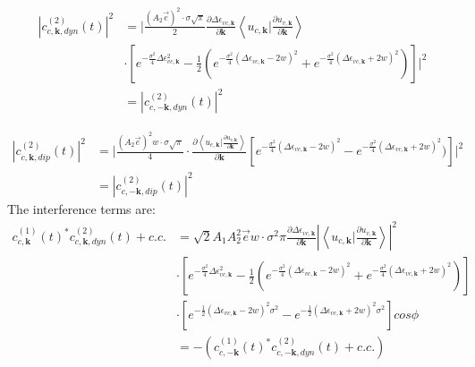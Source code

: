 \begin{equation}
\begin{aligned}
    |c^{(2)}_{c,\mathbf k,dyn}(t)|^2&= \lvert \frac{(A_2 \vec e)^2 \cdot \sigma \sqrt{\pi}}{2}
  \frac{\partial  \Delta \epsilon_{vc,\mathbf k}}{\partial \mathbf k} \left \langle u_{c,\mathbf k}\Big
  |\frac{\partial u_{v,\mathbf k}}{\partial \mathbf k} \right \rangle\\ 
                                  &    \cdot [e^{-\frac{\sigma^2}{4} \Delta \epsilon_{vc,\mathbf k} ^2}-\frac{1}{2}(e^{-\frac{\sigma^2}{4} (\Delta \epsilon_{vc,\mathbf k}-2w)^2}+e^{-\frac{\sigma^2}{4} (\Delta \epsilon_{vc,\mathbf k}+2w)^2})] \rvert^2\\
    &=|c^{(2)}_{c,-\mathbf k,dyn}(t)|^2
\end{aligned}
\end{equation}

\begin{equation}
\begin{aligned}
  |c^{(2)}_{c,\mathbf k,dip}(t)|^2&= \lvert \frac{(A_2 \vec e)^2 w \cdot \sigma \sqrt{\pi}}{4} \cdot \frac{\partial{\left \langle u_{c,\mathbf k}\Big |\frac{\partial u_{v,\mathbf k}}{\partial \mathbf k} \right \rangle}}{\partial {\mathbf k}}  [e^{-\frac{\sigma^2}{4} (\Delta \epsilon_{vc,\mathbf k}-2w)^2}-e^{-\frac{\sigma^2}{4} (\Delta \epsilon_{vc,\mathbf k}+2w)^2})] \rvert^2\\
  &=  |c^{(2)}_{c,-\mathbf k,dip}(t)|^2
\end{aligned}
\end{equation}
The interference terms are:
\begin{equation}
\begin{aligned}
    c^{(1)}_{c,\mathbf k}(t)^* c^{(2)}_{c,\mathbf k,dyn}(t) +c.c.&=
   \sqrt{2} A_1 A_2^2 \vec e w \cdot \sigma^2 \pi \frac{\partial  \Delta \epsilon_{vc,\mathbf k}}{\partial \mathbf k} |\left \langle u_{c,\mathbf k}\Big |\frac{\partial u_{v,\mathbf k}}{\partial \mathbf k} \right \rangle|^2 \\
    &\cdot [e^{-\frac{\sigma^2}{4} \Delta \epsilon_{vc,\mathbf k} ^2}-\frac{1}{2}(e^{-\frac{\sigma^2}{4} (\Delta \epsilon_{vc,\mathbf k}-2w)^2}+e^{-\frac{\sigma^2}{4} (\Delta \epsilon_{vc,\mathbf k}+2w)^2})]\\
    &\cdot[e^{-\frac{1}2{}(\Delta \epsilon_{vc,\mathbf k} - 2w)^2 \sigma^2}
    -e^{-\frac{1}{2}(\Delta \epsilon_{vc,\mathbf k} + 2w)^2 \sigma^2}
    ]cos\phi\\
    &= -(c^{(1)}_{c,-\mathbf k}(t)^* c^{(2)}_{c,-\mathbf k,dyn}(t) +c.c.)
\end{aligned}
\end{equation}


